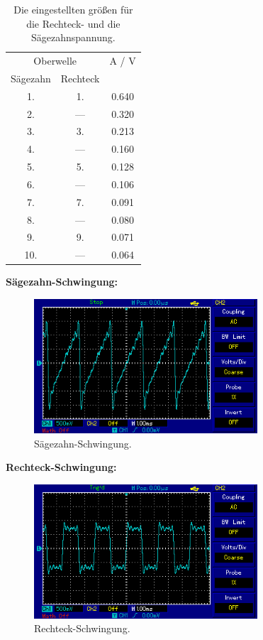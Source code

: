 \begin{table}[H]
  \centering
  \begin{tabular}{c c c}
    \toprule
    \multicolumn{2}{c}{Oberwelle} & A / V \\
    Sägezahn & Rechteck & \\
    \midrule
    1. & 1. & 0.640 \\
    2. & --- & 0.320 \\
    3. & 3. & 0.213 \\
    4. & --- & 0.160 \\
    5. & 5. & 0.128 \\
    6. & --- & 0.106 \\
    7. & 7. & 0.091 \\
    8. & --- & 0.080 \\
    9. & 9. & 0.071 \\
    10. & --- & 0.064 \\
    \bottomrule
  \end{tabular}
  \caption{Die eingestellten größen für die Rechteck- und die Sägezahnspannung.}
  \label{tab:SagRecht}
\end{table}

\textbf{Sägezahn-Schwingung:} \\
\begin{figure}[H]
  \centering
  \includegraphics[height=5cm]{picture/Saege.PNG}
  \caption{Sägezahn-Schwingung.}
  \label{fig:Säge}
\end{figure}

\newpage
\textbf{Rechteck-Schwingung:} \\
\begin{figure}[H]
  \centering
  \includegraphics[height=5cm]{picture/Rechteck.PNG}
  \caption{Rechteck-Schwingung.}
  \label{fig:Recht}
\end{figure}

